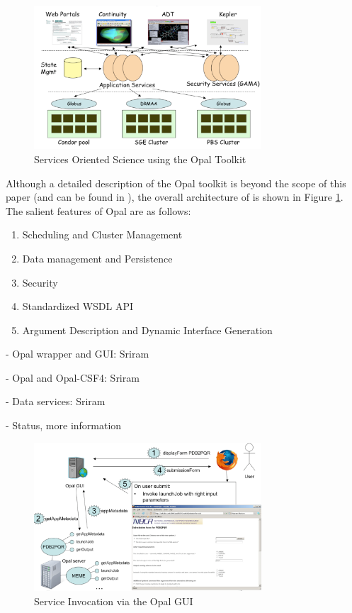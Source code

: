 \documentclass[conference]{IEEEtran}
\begin{document}
\begin{figure}
\begin{center}
\includegraphics[width=8.5cm]{architecture}
\end{center}
\caption{Services Oriented Science using the Opal Toolkit}
\label{fig:arch}
\end{figure}

Although a detailed description of the Opal toolkit is beyond the scope of
this paper (and can be found in \cite{opal}), the overall architecture of
is shown in Figure \ref{fig:arch}. The salient features of Opal are as
follows:

\begin{enumerate}
\item{Scheduling and Cluster Management}
\item{Data management and Persistence}
\item{Security}
\item{Standardized WSDL API}
\item{Argument Description and Dynamic Interface Generation}
\end{enumerate}

- Opal wrapper and GUI: Sriram 

- Opal and Opal-CSF4: Sriram

- Data services: Sriram

- Status, more information

\begin{figure}
\begin{center}
\includegraphics[width=8.5cm]{opal-gui}
\end{center}
\caption{Service Invocation via the Opal GUI}
\label{fig:opal-gui}
\end{figure}
\end{document}
